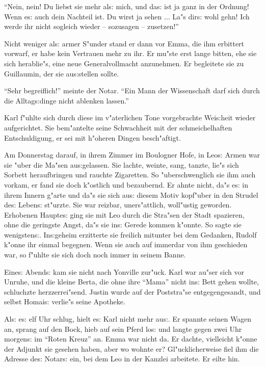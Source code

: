 \documentclass[oneside,12pt]{book}
\newcommand{\s}{s:}%
\begin{document}
"`Nein, nein! Du liebst sie mehr al{\s} mich, und da{\s} ist ja
ganz in der Ordnung! Wenn e{\s} auch dein Nachteil ist. Du wirst
ja sehen ... La"s dir{\s} wohl gehn! Ich werde ihr nicht sogleich
wieder -- sozusagen -- zusetzen!"'

Nicht weniger al{\s} armer S"under stand er dann vor Emma, die ihm
erbittert vorwarf, er habe kein Vertrauen mehr zu ihr. Er mu"ste
erst lange bitten, ehe sie sich herablie"s, eine neue
Generalvollmacht anzunehmen. Er begleitete sie zu Guillaumin, der
sie au{\s}stellen sollte.

"`Sehr begreiflich!"' meinte der Notar. "`Ein Mann der
Wissenschaft darf sich durch die Alltag{\s}dinge nicht ablenken
lassen."'

Karl f"uhlte sich durch diese im v"aterlichen Tone vorgebrachte
Wei{\s}heit wieder aufgerichtet. Sie bem"antelte seine Schwachheit
mit der schmeichelhaften Entschuldigung, er sei mit h"oheren
Dingen besch"aftigt.

Am Donnerstag darauf, in ihrem Zimmer im Boulogner Hofe, in
Leo{\s} Armen war sie "uber die Ma"sen au{\s}gelassen. Sie lachte,
weinte, sang, tanzte, lie"s sich Sorbett heraufbringen und rauchte
Zigaretten. So "uberschwenglich sie ihm auch vorkam, er fand sie
doch k"ostlich und bezaubernd. Er ahnte nicht, da"s e{\s} in ihrem
Innern g"arte und da"s sie sich au{\s} diesem Motiv kopf"uber in
den Strudel de{\s} Leben{\s} st"urzte. Sie war reizbar,
uners"attlich, woll"ustig geworden. Erhobenen Haupte{\s} ging sie
mit Leo durch die Stra"sen der Stadt spazieren, ohne die geringste
Angst, da"s sie in{\s} Gerede kommen k"onnte. So sagte sie
wenigsten{\s}. In{\s}geheim erzitterte sie freilich mitunter bei
dem Gedanken, Rudolf k"onne ihr einmal begegnen. Wenn sie auch auf
immerdar von ihm geschieden war, so f"uhlte sie sich doch noch
immer in seinem Banne.

Eine{\s} Abend{\s} kam sie nicht nach Yonville zur"uck. Karl war
au"ser sich vor Unruhe, und die kleine Berta, die ohne ihre
"`Mama"' nicht in{\s} Bett gehen wollte, schluchzte herzzerrei"send.
Justin wurde auf der Poststra"se entgegengesandt, und selbst
Homai{\s} verlie"s seine Apotheke.

Al{\s} e{\s} elf Uhr schlug, hielt e{\s} Karl nicht mehr au{\s}.
Er spannte seinen Wagen an, sprang auf den Bock, hieb auf sein
Pferd lo{\s} und langte gegen zwei Uhr morgen{\s} im "`Roten
Kreuz"' an. Emma war nicht da. Er dachte, vielleicht k"onne der
Adjunkt sie gesehen haben, aber wo wohnte er? Gl"ucklicherweise
fiel ihm die Adresse de{\s} Notar{\s} ein, bei dem Leo in der
Kanzlei arbeitete. Er eilte hin.
\end{document}
